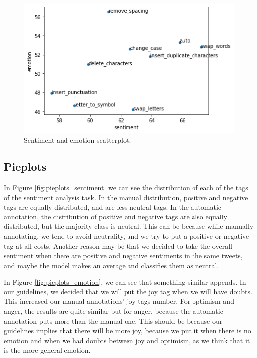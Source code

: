 \documentclass[11pt,a4paper]{article}
\begin{document}
\begin{figure}[ht]
    \centering
    \includegraphics[width=\linewidth]{scatterplot_sentiment_emotion.png}
    \caption{Sentiment and emotion scatterplot.}
    \label{fig:scatterplot}
\end{figure}

\subsection{Pieplots}

In Figure \ref{fig:pieplots_sentiment} we can see the distribution of each of the tags of the sentiment analysis task. In the manual distribution, positive and negative tags are equally distributed, and are less neutral tags. In the automatic annotation, the distribution of positive and negative tags are also equally distributed, but the majority class is neutral. This can be because while manually annotating, we tend to avoid neutrality, and we try to put a positive or negative tag at all costs. Another reason may be that we decided to take the overall sentiment when there are positive and negative sentiments in the same tweets, and maybe the model makes an average and classifies them as neutral.

In Figure \ref{fig:pieplots_emotion}, we can see that something similar appends. In our guidelines, we decided that we will put the joy tag when we will have doubts. This increased our manual annotations' joy tags number. For optimism and anger, the results are quite similar but for anger, because the automatic annotation puts more than the manual one. This should be because our guidelines implies that there will be more joy, because we put it when there is no emotion and when we had doubts between joy and optimism, as we think that it is the more general emotion. 
\end{document}
